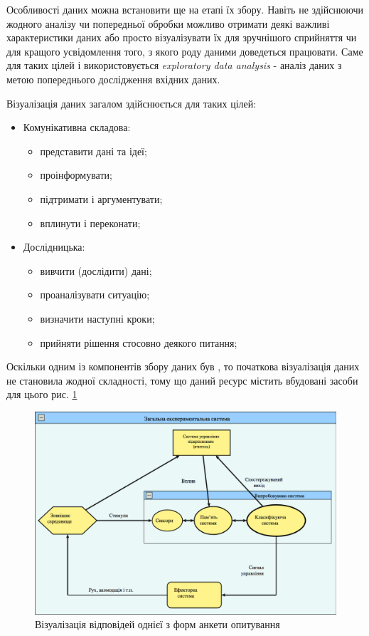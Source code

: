 Особливості даних можна встановити ще на етапі їх збору. Навіть не здійснюючи жодного аналізу чи попередньої обробки можливо отримати деякі важливі характеристики даних або просто візуалізувати їх для зручнішого сприйняття чи для кращого усвідомлення того, з якого роду даними доведеться працювати. Саме для таких цілей і використовується \textit{exploratory data analysis} - аналіз даних з метою попереднього дослідження вхідних даних.

Візуалізація даних загалом здійснюється для таких цілей:
\begin{itemize}  
	\item Комунікативна складова:
	\begin{itemize}
		\item представити дані та ідеї;
		\item проінформувати;
		\item підтримати і аргументувати;
		\item вплинути і переконати;
	\end{itemize}
	\item Дослідницька:
	\begin{itemize}
		\item вивчити (дослідити) дані;
		\item проаналізувати ситуацію;
		\item визначити наступні кроки;
		\item прийняти рішення стосовно деякого питання;
	\end{itemize}
\end{itemize}

Оскільки одним із компонентів збору даних був , то початкова візуалізація даних не становила жодної складності, тому що даний ресурс містить вбудовані засоби для цього рис. \ref{fig:answer_visualize} 

\begin{figure}[h!]
  \includegraphics[width=\linewidth]{figures/fig_system.png}
  \caption{Візуалізація відповідей однієї з форм анкети опитування}
  \label{fig:answer_visualize}
\end{figure}

